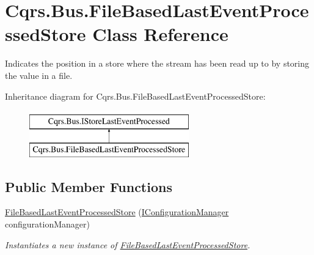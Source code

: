 \hypertarget{classCqrs_1_1Bus_1_1FileBasedLastEventProcessedStore}{}\section{Cqrs.\+Bus.\+File\+Based\+Last\+Event\+Processed\+Store Class Reference}
\label{classCqrs_1_1Bus_1_1FileBasedLastEventProcessedStore}


Indicates the position in a store where the stream has been read up to by storing the value in a file.  


Inheritance diagram for Cqrs.\+Bus.\+File\+Based\+Last\+Event\+Processed\+Store\+:\begin{figure}[H]
\begin{center}
\leavevmode
\includegraphics[height=2.000000cm]{classCqrs_1_1Bus_1_1FileBasedLastEventProcessedStore}
\end{center}
\end{figure}
\subsection*{Public Member Functions}
\begin{DoxyCompactItemize}
\item 
\hyperlink{classCqrs_1_1Bus_1_1FileBasedLastEventProcessedStore_a9e7f5bb54ffc9970f57e1712e9008e8a_a9e7f5bb54ffc9970f57e1712e9008e8a}{File\+Based\+Last\+Event\+Processed\+Store} (\hyperlink{interfaceCqrs_1_1Configuration_1_1IConfigurationManager}{I\+Configuration\+Manager} configuration\+Manager)
\begin{DoxyCompactList}\small\item\em Instantiates a new instance of \hyperlink{classCqrs_1_1Bus_1_1FileBasedLastEventProcessedStore}{File\+Based\+Last\+Event\+Processed\+Store}. \end{DoxyCompactList}\end{DoxyCompactItemize}

